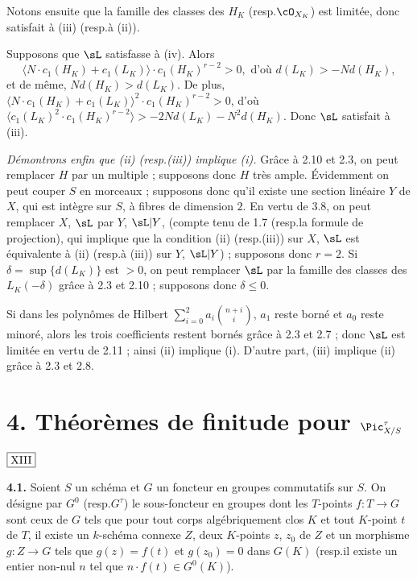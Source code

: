 Notons ensuite que la famille des classes des $H_K$ (resp.\@ $\cO_{X_K}$) est limitée, donc satisfait à (iii) (resp.\@ à (ii)).

Supposons que $\sL$ satisfasse à (iv). Alors
\[
\langle N \cdot c_1(H_K) + c_1(L_K) \rangle \cdot c_1(H_K)^{r-2} > 0, \text{ d'où } d(L_K) > -N d(H_K),
\]
et de même, $N d(H_K) > d(L_K)$. De plus, $\langle N \cdot c_1(H_K) + c_1(L_K) \rangle^2 \cdot c_1(H_K)^{r-2} > 0$, d'où $\langle c_1(L_K)^2 \cdot c_1(H_K)^{r-2} \rangle > -2N d(L_K) - N^2 d(H_K)$. Donc $\sL$ satisfait à (iii).

\noindent\textit{Démontrons enfin que (ii) (resp.\@ (iii)) implique (i).} Grâce à 2.10 et 2.3, on peut remplacer $H$ par un multiple ; supposons donc $H$ très ample. Évidemment on peut couper $S$ en morceaux ; supposons donc qu'il existe une section linéaire $Y$ de $X$, qui est intègre sur $S$, à fibres de dimension $2$. En vertu de 3.8, on peut remplacer $X$, $\sL$ par $Y$, $\sL|Y$, (compte tenu de 1.7 (resp.\@ la formule de projection), qui implique que la condition (ii) (resp.\@ (iii)) sur $X$, $\sL$ est équivalente à (ii) (resp.\@ à (iii)) sur $Y$, $\sL|Y$) ; supposons donc $r=2$. Si $\delta = \sup\{d(L_K)\}$ est $> 0$, on peut remplacer $\sL$ par la famille des classes des $L_K(-\delta)$ grâce à 2.3 et 2.10 ; supposons donc $\delta \leq 0$.

Si dans les polynômes de Hilbert $\sum_{i=0}^{2} a_i \binom{n+i}{i}$, $a_1$ reste borné et $a_0$ reste minoré, alors les trois coefficients restent bornés grâce à 2.3 et 2.7 ; donc $\sL$ est limitée en vertu de 2.11 ; ainsi (ii) implique (i). D'autre part, (iii) implique (ii) grâce à 2.3 et 2.8.

\section*{4. Théorèmes de finitude pour $\Pic^{\tau}_{X/S}$}

\begin{flushright}
$\fbox{\text{XIII}}$
\end{flushright}

\smallskip
\noindent\textbf{4.1.} Soient $S$ un schéma et $G$ un foncteur en groupes commutatifs sur $S$. On désigne par $G^0$ (resp.\@ $G^{\tau}$) le sous-foncteur en groupes dont les $T$-points $f : T \to G$ sont ceux de $G$ tels que pour tout corps algébriquement clos $K$ et tout $K$-point $t$ de $T$, il existe un $k$-schéma connexe $Z$, deux $K$-points $z$, $z_0$ de $Z$ et un morphisme $g : Z \to G$ tels que $g(z) = f(t)$ et $g(z_0) = 0$ dans $G(K)$ (resp.\@ il existe un entier non-nul $n$ tel que $n \cdot f(t) \in G^0(K)$).

